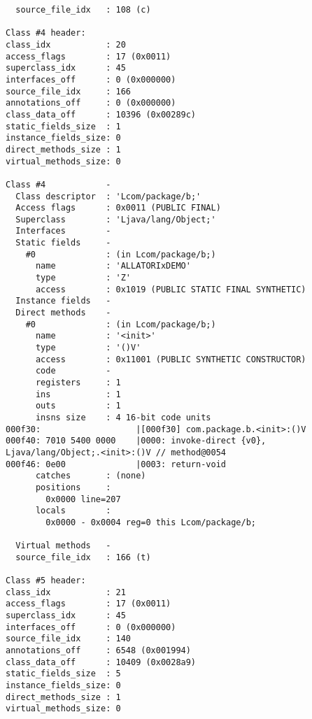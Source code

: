 \begin{lstlisting}
  source_file_idx   : 108 (c)

Class #4 header:
class_idx           : 20
access_flags        : 17 (0x0011)
superclass_idx      : 45
interfaces_off      : 0 (0x000000)
source_file_idx     : 166
annotations_off     : 0 (0x000000)
class_data_off      : 10396 (0x00289c)
static_fields_size  : 1
instance_fields_size: 0
direct_methods_size : 1
virtual_methods_size: 0

Class #4            -
  Class descriptor  : 'Lcom/package/b;'
  Access flags      : 0x0011 (PUBLIC FINAL)
  Superclass        : 'Ljava/lang/Object;'
  Interfaces        -
  Static fields     -
    #0              : (in Lcom/package/b;)
      name          : 'ALLATORIxDEMO'
      type          : 'Z'
      access        : 0x1019 (PUBLIC STATIC FINAL SYNTHETIC)
  Instance fields   -
  Direct methods    -
    #0              : (in Lcom/package/b;)
      name          : '<init>'
      type          : '()V'
      access        : 0x11001 (PUBLIC SYNTHETIC CONSTRUCTOR)
      code          -
      registers     : 1
      ins           : 1
      outs          : 1
      insns size    : 4 16-bit code units
000f30:                   |[000f30] com.package.b.<init>:()V
000f40: 7010 5400 0000    |0000: invoke-direct {v0}, Ljava/lang/Object;.<init>:()V // method@0054
000f46: 0e00              |0003: return-void
      catches       : (none)
      positions     :
        0x0000 line=207
      locals        :
        0x0000 - 0x0004 reg=0 this Lcom/package/b;

  Virtual methods   -
  source_file_idx   : 166 (t)

Class #5 header:
class_idx           : 21
access_flags        : 17 (0x0011)
superclass_idx      : 45
interfaces_off      : 0 (0x000000)
source_file_idx     : 140
annotations_off     : 6548 (0x001994)
class_data_off      : 10409 (0x0028a9)
static_fields_size  : 5
instance_fields_size: 0
direct_methods_size : 1
virtual_methods_size: 0


\end{lstlisting}
